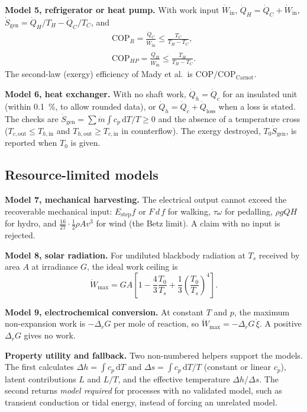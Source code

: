 \documentclass[journal=iecred,manuscript=article,layout=twocolumn,email=false]{achemso}
\begin{document}
\textbf{Model 5, refrigerator or heat pump.} With work input $\dot W_\mathrm{in}$, $\dot Q_H=\dot Q_C+\dot W_\mathrm{in}$,
$\dot S_\mathrm{gen}=\dot Q_H/T_H-\dot Q_C/T_C$, and
\begin{gather}
\mathrm{COP}_R=\frac{\dot Q_C}{\dot W_\mathrm{in}}\le\frac{T_C}{T_H-T_C},\nonumber\\
\mathrm{COP}_{HP}=\frac{\dot Q_H}{\dot W_\mathrm{in}}\le\frac{T_H}{T_H-T_C}.
\end{gather}
The second-law (exergy) efficiency of Mady et al.\ is $\mathrm{COP}/\mathrm{COP}_\mathrm{Carnot}$.\cite{Mady2020}

\textbf{Model 6, heat exchanger.} With no shaft work, $\dot Q_h=\dot Q_c$ for an insulated unit (within
\SI{0.1}{\percent}, to allow rounded data), or $\dot Q_h=\dot Q_c+\dot Q_\mathrm{loss}$ when a loss is stated. The checks
are $\dot S_\mathrm{gen}=\sum\dot m\int c_p\,\mathrm{d}T/T\ge0$ and the absence of a temperature cross
($T_{c,\mathrm{out}}\le T_{h,\mathrm{in}}$ and $T_{h,\mathrm{out}}\ge T_{c,\mathrm{in}}$ in counterflow). The exergy
destroyed, $T_0\dot S_\mathrm{gen}$, is reported when $T_0$ is given.\cite{Pal2017}

\subsection{Resource-limited models}
\textbf{Model 7, mechanical harvesting.} The electrical output cannot exceed the recoverable mechanical input:
$E_\mathrm{step}f$ or $F\,d\,f$ for walking, $\tau\omega$ for pedalling, $\rho gQH$ for hydro, and
$\tfrac{16}{27}\cdot\tfrac12\rho Av^3$ for wind (the Betz limit).\cite{Betz1920} A claim with no input is rejected.

\textbf{Model 8, solar radiation.} For undiluted blackbody radiation at $T_s$ received by area $A$ at irradiance $G$,
the ideal work ceiling is\cite{Petela2003}
\begin{equation}
\dot W_\mathrm{max}=GA\left[1-\frac43\frac{T_0}{T_s}+\frac13\left(\frac{T_0}{T_s}\right)^4\right].
\label{eq:petela}
\end{equation}

\textbf{Model 9, electrochemical conversion.} At constant $T$ and $p$, the maximum non-expansion work is
$-\Delta_rG$ per mole of reaction, so $\dot W_\mathrm{max}=-\Delta_rG\,\dot\xi$. A positive $\Delta_rG$ gives no
work.\cite{NETL2004}

\textbf{Property utility and fallback.} Two non-numbered helpers support the models. The first calculates $\Delta h=\int
c_p\,\mathrm{d}T$ and $\Delta s=\int c_p\,\mathrm{d}T/T$ (constant or linear $c_p$), latent contributions $L$ and $L/T$,
and the effective temperature $\Delta h/\Delta s$. The second returns \emph{model required} for processes with no
validated model, such as transient conduction or tidal energy, instead of forcing an unrelated model.
\end{document}

